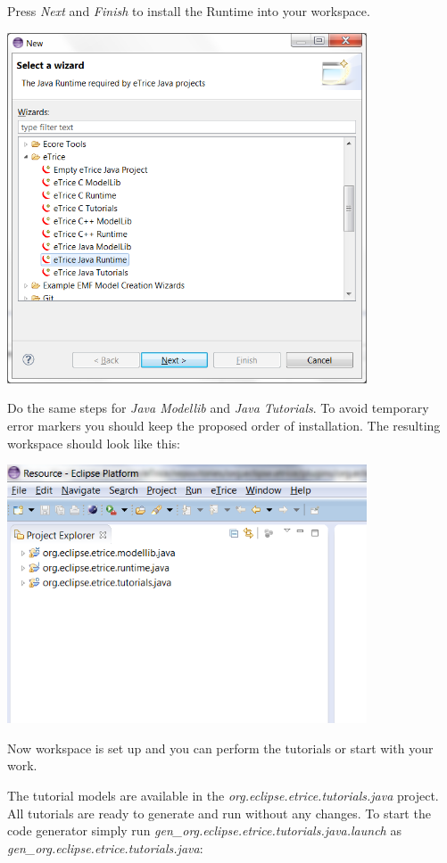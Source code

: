 Press \textit{Next} and \textit{Finish} to install the Runtime into your workspace.

\includegraphics[width=0.8\textwidth]{images/013-SetupWorkspace03.png}

Do the same steps for \textit{\eTrice{} Java Modellib} and \textit{\eTrice{} Java Tutorials}. To avoid temporary 
error markers you should keep the proposed order of installation. The resulting workspace should look like 
this:

\includegraphics[width=0.8\textwidth]{images/013-SetupWorkspace04.png}

Now workspace is set up and you can perform the tutorials or start with your work.

The tutorial models are available in the \textit{org.eclipse.etrice.tutorials.java} project. All tutorials are 
ready to generate and run without any changes. To start the code generator simply run 
\emph{gen\_org.eclipse.etrice.tutorials.java.launch} as \emph{gen\_org.eclipse.etrice.tutorials.java}: 

